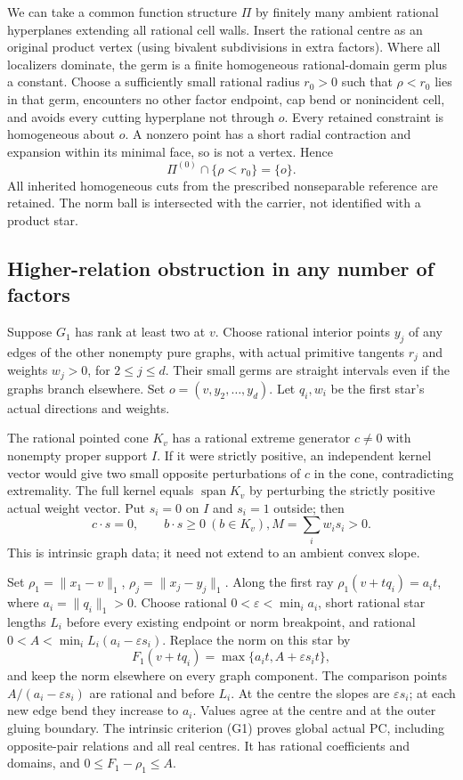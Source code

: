 \documentclass[
  11pt,
]{article}
\begin{document}
We can take a common function structure \(\Pi\) by finitely many ambient
rational hyperplanes extending all rational cell walls. Insert the
rational centre as an original product vertex (using bivalent
subdivisions in extra factors). Where all localizers dominate, the germ
is a finite homogeneous rational-domain germ plus a constant. Choose a
sufficiently small rational radius \(r_0>0\) such that \(\rho<r_0\) lies
in that germ, encounters no other factor endpoint, cap bend or
nonincident cell, and avoids every cutting hyperplane not through \(o\).
Every retained constraint is homogeneous about \(o\). A nonzero point
has a short radial contraction and expansion within its minimal face, so
is not a vertex. Hence \[
                    \Pi^{(0)}\cap\{\rho<r_0\}=\{o\}.
 \tag{V}
\] All inherited homogeneous cuts from the prescribed nonseparable
reference are retained. The norm ball is intersected with the carrier,
not identified with a product star.

\subsection{Higher-relation obstruction in any number of
factors}\label{higher-relation-obstruction-in-any-number-of-factors}

Suppose \(G_1\) has rank at least two at \(v\). Choose rational interior
points \(y_j\) of any edges of the other nonempty pure graphs, with
actual primitive tangents \(r_j\) and weights \(w_j>0\), for
\(2\leq j\leq d\). Their small germs are straight intervals even if the
graphs branch elsewhere. Set \(o=(v,y_2,\ldots,y_d)\). Let \(q_i,w_i\)
be the first star's actual directions and weights.

The rational pointed cone \(K_v\) has a rational extreme generator
\(c\ne0\) with nonempty proper support \(I\). If it were strictly
positive, an independent kernel vector would give two small opposite
perturbations of \(c\) in the cone, contradicting extremality. The full
kernel equals \(\operatorname{span}K_v\) by perturbing the strictly
positive actual weight vector. Put \(s_i=0\) on \(I\) and \(s_i=1\)
outside; then \[
       c\cdot s=0,\qquad b\cdot s\geq0\ (b\in K_v),
                  M=\sum_iw_is_i>0.
\] This is intrinsic graph data; it need not extend to an ambient convex
slope.

Set \(\rho_1=\|x_1-v\|_1\), \(\rho_j=\|x_j-y_j\|_1\). Along the first
ray \(\rho_1(v+tq_i)=a_it\), where \(a_i=\|q_i\|_1>0\). Choose rational
\(0<\varepsilon<\min_i a_i\), short rational star lengths \(L_i\) before
every existing endpoint or norm breakpoint, and rational
\(0<A<\min_iL_i(a_i-\varepsilon s_i)\). Replace the norm on this star by
\[
       F_1(v+tq_i)=\max\{a_it,A+\varepsilon s_it\},
\] and keep the norm elsewhere on every graph component. The comparison
points \(A/(a_i-\varepsilon s_i)\) are rational and before \(L_i\). At
the centre the slopes are \(\varepsilon s_i\); at each new edge bend
they increase to \(a_i\). Values agree at the centre and at the outer
gluing boundary. The intrinsic criterion (G1) proves global actual PC,
including opposite-pair relations and all real centres. It has rational
coefficients and domains, and \(0\leq F_1-\rho_1\leq A\).
\end{document}
